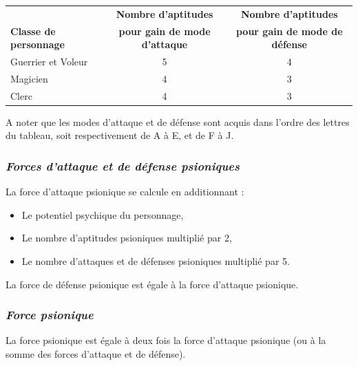\documentclass[11pt]{article}
\begin{document}
{\bigskip

\begin{tabular}{lcc}
& \textbf{Nombre d'aptitudes} & \textbf{Nombre d'aptitudes} \\
\textbf{Classe de personnage} & \textbf{pour gain de mode d'attaque} & \textbf{pour gain de mode de défense} \\
Guerrier et Voleur & 5 & 4 \\
Magicien & 4 & 3 \\
Clerc & 4 & 3 \\
\end{tabular}

\bigskip

A noter que les modes d'attaque et de défense sont acquis dans l'ordre des lettres du tableau, soit respectivement de A à E, et de F à J.

\subsubsection*{\textit{Forces d'attaque et de défense psioniques}}

La force d'attaque psionique se calcule en additionnant :

\bigskip

\begin{itemize}
\item Le potentiel psychique du personnage,
\item Le nombre d'aptitudes psioniques multiplié par 2,
\item Le nombre d'attaques et de défenses psioniques multiplié par 5.
\end{itemize}

\bigskip

La force de défense psionique est égale à la force d'attaque psionique.

\bigskip

\subsubsection*{\textit{Force psionique}}

La force psionique est égale à deux fois la force d'attaque psionique (ou à la somme des forces d'attaque et de défense).

}
\end{document}
